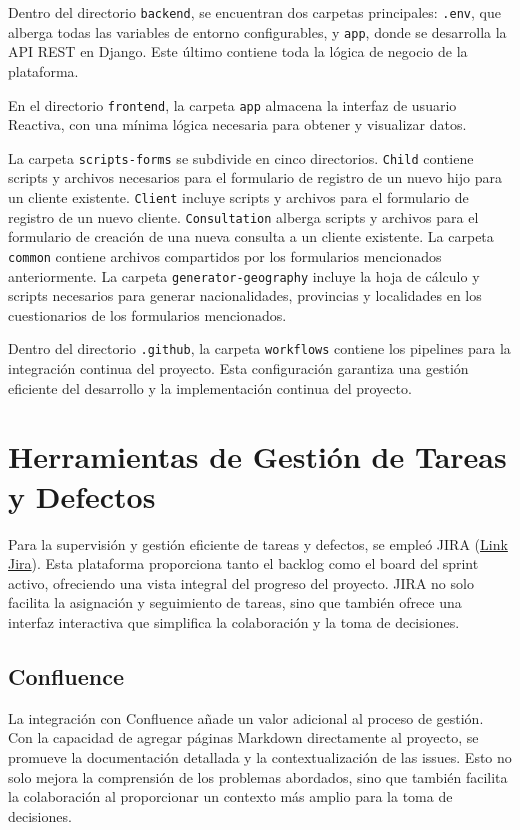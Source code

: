 Dentro del directorio \texttt{backend}, se encuentran dos carpetas principales: \texttt{.env}, que alberga todas las variables de entorno configurables, y \texttt{app}, donde se desarrolla la API REST en Django. Este último contiene toda la lógica de negocio de la plataforma.

En el directorio \texttt{frontend}, la carpeta \texttt{app} almacena la interfaz de usuario Reactiva, con una mínima lógica necesaria para obtener y visualizar datos.

La carpeta \texttt{scripts-forms} se subdivide en cinco directorios. \texttt{Child} contiene scripts y archivos necesarios para el formulario de registro de un nuevo hijo para un cliente existente. \texttt{Client} incluye scripts y archivos para el formulario de registro de un nuevo cliente. \texttt{Consultation} alberga scripts y archivos para el formulario de creación de una nueva consulta a un cliente existente. La carpeta \texttt{common} contiene archivos compartidos por los formularios mencionados anteriormente. La carpeta \texttt{generator-geography} incluye la hoja de cálculo y scripts necesarios para generar nacionalidades, provincias y localidades en los cuestionarios de los formularios mencionados.

Dentro del directorio \texttt{.github}, la carpeta \texttt{workflows} contiene los pipelines para la integración continua del proyecto. Esta configuración garantiza una gestión eficiente del desarrollo y la implementación continua del proyecto.


\section{Herramientas de Gestión de Tareas y Defectos}

Para la supervisión y gestión eficiente de tareas y defectos, se empleó JIRA (\href{https://prietojulii.atlassian.net/jira/software/projects/PAT/boards/1}{Link Jira}). Esta plataforma proporciona tanto el backlog como el board del sprint activo, ofreciendo una vista integral del progreso del proyecto. JIRA no solo facilita la asignación y seguimiento de tareas, sino que también ofrece una interfaz interactiva que simplifica la colaboración y la toma de decisiones. 

\subsection{Confluence}
La integración con Confluence añade un valor adicional al proceso de gestión. Con la capacidad de agregar páginas Markdown directamente al proyecto, se promueve la documentación detallada y la contextualización de las issues. Esto no solo mejora la comprensión de los problemas abordados, sino que también facilita la colaboración al proporcionar un contexto más amplio para la toma de decisiones.

